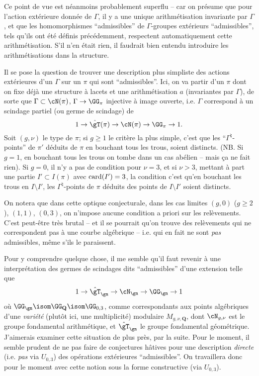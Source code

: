 Ce point de vue est néanmoins probablement superflu -- car
on présume que pour l'action extérieure donnée de
$\Gamma$, il y a une unique arithmétisation invariante
par $\Gamma$, et que les homomorphismes ``admissibles''
de $\Gamma$-groupes extérieurs ``admissibles'', tels qu'ils
ont été définis précédemment, respectent
automatiquement cette arithmétisation.  S'il n'en était
rien, il faudrait bien entendu introduire les arithmétisations
dans la structure.

Il se pose la question de trouver une description plus simpliste
des actions extérieures d'un $\Gamma$ sur un $\pi$ qui sont
``admissibles''.  Ici, on va partir d'un $\pi$ dont on fixe déjà
une structure à lacets et une arithmétisation $a$ (invariantes
par $\Gamma$), de sorte que $\Gamma\subset \cN(\pi)$,
$\Gamma\to\GG_\pi$ injective à image ouverte,
i.e. $\Gamma$ correspond à un scindage partiel (ou germe
de scindage) de
$$1\to \hat\gT(\pi)\to \cN(\pi)\to
\GG_\pi\to 1.$$
Soit $(g,\nu)$ le type de $\pi$; si $g\ge 1$ le critère
la plus simple, c'est que les ``$\Gamma^\natural$-points''
de $\pi'$ déduits de $\pi$ en bouchant tous les trous,
soient distincts.  (NB. Si $g=1$, en bouchant tous les trous
on tombe dans un cas abélien -- mais \c ca ne fait rien).
Si $g=0$, il n'y a pas de condition pour $\nu=3$, et
si $\nu>3$, mettant à part une partie $I'\subset  I(\pi)$
avec ${\rm card}(I')=3$, la condition c'est qu'en bouchant
les trous en $I\setminus I'$, les
$\Gamma^\natural$-points de $\pi$ déduits des points de
$I\setminus I'$ soient distincts.

On notera que dans cette optique conjecturale, dans les cas
limites $(g,0)$ ($g\ge 2$), $(1,1)$, $(0,3)$, on n'impose aucune
condition a priori sur les relèvements.
C'est peut-être très brutal -- et il se pourrait qu'on
trouve des relèvements qui ne correspondent pas à une
courbe algébrique -- i.e. qui en fait ne sont {\it pas}
admissibles, même s'ils le paraissent.

Pour y comprendre quelque chose, il me semble qu'il faut
revenir à une interprétation des germes de scindages dits
``admissibles'' d'une extension telle que
$$1\to\hat\gT_\gn\to\cN_\gn\to
\GG_\gn\to 1$$
où $\GG_\gn \isom \GG_{\mathbf{Q}} \isom \GG_{0,3}$, comme correspondants
aux points algébriques d'une {\it variété} (plutôt ici,
une multiplicité) modulaire $M_{g,\nu,{\mathbf{Q}}}$, dont
$\cN_{g,\nu}$ est le groupe fondamental arithmétique,
et $\hat\gT_\gn$ le groupe fondamental géométrique.
J'aimerais examiner cette situation de plus près, par la suite.
Pour le moment, il semble prudent de ne pas faire de conjectures
h\^atives pour une description {\it directe}
(i.e. {\it pas} via $U_{0,3}$) des opérations extérieures
``admissibles''.  On travaillera donc pour le moment avec cette
notion sous la forme constructive (via $U_{0,3}$).

